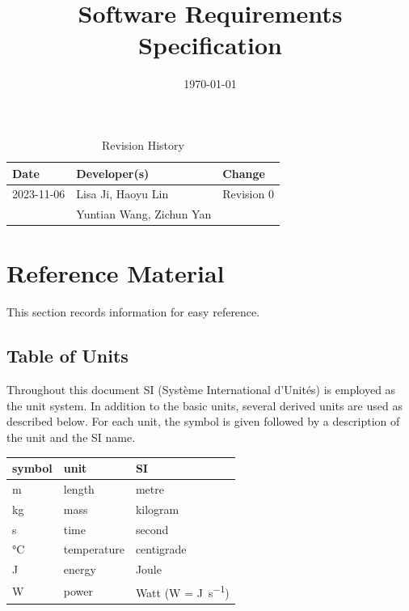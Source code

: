 \documentclass[12pt]{article}
\title{Software Requirements Specification\\\progname}
\author{\authname}
\date{\today}
\begin{document}
\maketitle
{}

\newpage
\begin{table}[hp]
    \caption{Revision History} \label{TblRevisionHistory}
    \begin{tabularx}{\textwidth}{llX}
        \toprule
        \textbf{Date} & \textbf{Developer(s)} & \textbf{Change}\\
        \midrule
        2023-11-06 & Lisa Ji, Haoyu Lin & Revision 0\\
        & Yuntian Wang, Zichun Yan & \\
        \bottomrule
    \end{tabularx}
\end{table}

\newpage
\tableofcontents
\newpage
\listoftables
\listoffigures

\newpage
\section{Reference Material}
    This section records information for easy reference.
    \subsection{Table of Units}
        Throughout this document SI (Syst\`{e}me International d'Unit\'{e}s) is employed
        as the unit system.  In addition to the basic units, several derived units are
        used as described below.  For each unit, the symbol is given followed by a
        description of the unit and the SI name.
        ~\newline
    
        \renewcommand{\arraystretch}{1.2}
          \noindent \begin{tabular}{l l l} 
            \toprule		
            \textbf{symbol} & \textbf{unit} & \textbf{SI}\\
            \midrule 
            \si{\metre} & length & metre\\
            \si{\kilogram} & mass	& kilogram\\
            \si{\second} & time & second\\
            \si{\celsius} & temperature & centigrade\\
            \si{\joule} & energy & Joule\\
            \si{\watt} & power & Watt (W = \si{\joule\per\second})\\
            \bottomrule
          \end{tabular}
\end{document}
